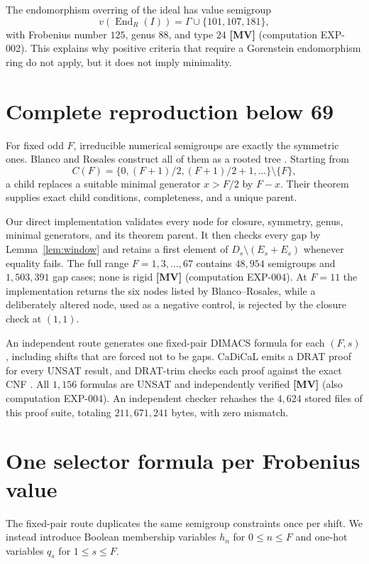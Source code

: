 \documentclass[11pt]{article}
\theoremstyle{definition}
\theoremstyle{remark}
\begin{document}
The endomorphism overring of the ideal has value semigroup
\[
  v(\operatorname{End}_R(I))=\Gamma\cup\{101,107,181\},
\]
with Frobenius number $125$, genus $88$, and type $24$ \textbf{[MV]} (computation EXP-002). This
explains why positive criteria that require a Gorenstein endomorphism ring do not apply, but it
does not imply minimality.

\section{Complete reproduction below 69}

For fixed odd $F$, irreducible numerical semigroups are exactly the symmetric ones. Blanco and
Rosales construct all of them as a rooted tree \cite{BlancoRosales2013}. Starting from
\[
 C(F)=\{0,(F+1)/2,(F+1)/2+1,\ldots\}\setminus\{F\},
\]
a child replaces a suitable minimal generator $x>F/2$ by $F-x$. Their theorem supplies exact
child conditions, completeness, and a unique parent.

Our direct implementation validates every node for closure, symmetry, genus, minimal generators,
and its theorem parent. It then checks every gap by Lemma~\ref{lem:window} and retains a first
element of $D_s\setminus(E_s+E_s)$ whenever equality fails. The full range $F=1,3,\ldots,67$
contains $48{,}954$ semigroups and $1{,}503{,}391$ gap cases; none is rigid \textbf{[MV]}
(computation EXP-004). At $F=11$ the implementation returns the six nodes listed by
Blanco--Rosales, while a deliberately altered node, used as a negative control, is rejected by the
closure check at $(1,1)$.

An independent route generates one fixed-pair DIMACS formula for each $(F,s)$, including shifts
that are forced not to be gaps. CaDiCaL emits a DRAT proof for every UNSAT result, and DRAT-trim
checks each proof against the exact CNF \cite{Cadical2023,DRAT2014}. All $1{,}156$ formulas are
UNSAT and independently verified \textbf{[MV]} (also computation EXP-004). An independent checker
rehashes the $4{,}624$ stored files of this proof suite, totaling $211{,}671{,}241$ bytes, with zero
mismatch.

\section{One selector formula per Frobenius value}

The fixed-pair route duplicates the same semigroup constraints once per shift. We instead introduce
Boolean membership variables $h_n$ for $0\le n\le F$ and one-hot variables $q_s$ for
$1\le s\le F$.
\end{document}

